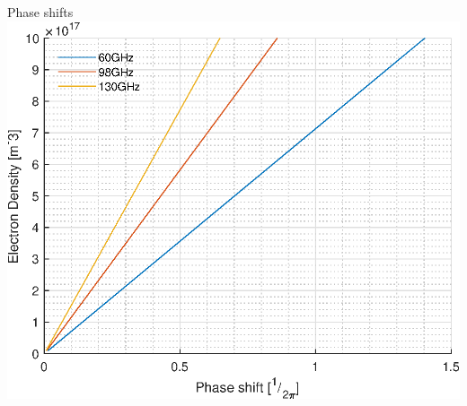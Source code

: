 \documentclass[hyperref={colorlinks=true,urlcolor=blue,linkcolor=.},aspectratio=1610,mathserif]{beamer}
\begin{document}
\begin{frame}{Phase shifts}
	\includegraphics[width=.9\textwidth]{MatlabFigures/PhaseShift/PhaseShift.eps}
\end{frame}
\end{document}
